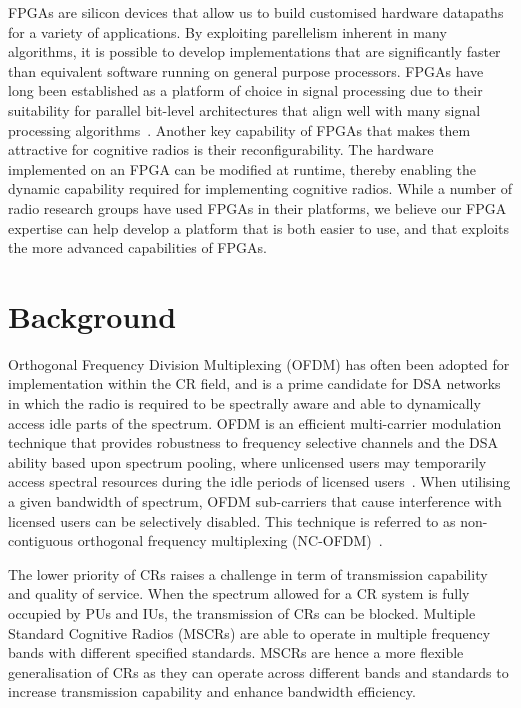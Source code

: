 FPGAs are silicon devices that allow us to build customised hardware datapaths for a variety of applications.
By exploiting parellelism inherent in many algorithms, it is possible to develop implementations that are significantly faster than equivalent software running on general purpose processors.
FPGAs have long been established as a platform of choice in signal processing due to their suitability for parallel bit-level architectures that align well with many signal processing algorithms~\cite{cummings1999}.
Another key capability of FPGAs that makes them attractive for cognitive radios is their reconfigurability.
The hardware implemented on an FPGA can be modified at runtime, thereby enabling the dynamic capability required for implementing cognitive radios.
While a number of radio research groups have used FPGAs in their platforms, we believe our FPGA expertise can help develop a platform that is both easier to use, and that exploits the more advanced capabilities of FPGAs.

 \section{Background}

 Orthogonal Frequency Division Multiplexing (OFDM) has often been adopted for implementation within the CR field, and is a prime candidate for DSA networks in which the radio is required to be spectrally aware and able to dynamically access idle parts of the spectrum.
 OFDM is an efficient multi-carrier modulation technique that provides robustness to frequency selective channels and the DSA ability based upon spectrum pooling, where unlicensed users may temporarily access spectral resources during the idle periods of licensed users~\cite{JondralMarch2004}.
 When utilising a given bandwidth of spectrum, OFDM sub-carriers that cause interference with licensed users can be selectively disabled.
 This technique is referred to as non-contiguous orthogonal frequency multiplexing (NC-OFDM)~\cite{MindenJune2006}.

 The lower priority of CRs raises a challenge in term of transmission capability and quality of service. When the spectrum allowed for a CR system is fully occupied by PUs and IUs, the transmission of CRs can be blocked.
 Multiple Standard Cognitive Radios (MSCRs) are able to operate in multiple frequency bands with different specified standards.
 MSCRs are hence a more flexible generalisation of CRs as they can operate across different bands and standards to increase transmission capability and enhance bandwidth efficiency.

